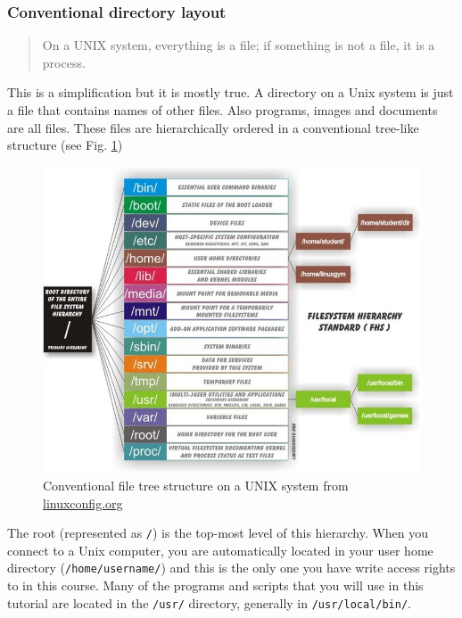\documentclass[11pt]{article}
\begin{document}
\subsubsection{Conventional directory layout}
\label{sec:orgheadline2}

\begin{quote}
On a UNIX system, everything is a file; if something is not a file, it is a process.
\end{quote}

This is a simplification but it is mostly true. A directory on a Unix
system is just a file that contains names of other files. Also
programs, images and documents are all files. These files are
hierarchically ordered in a conventional tree-like structure (see
Fig. \ref{fig:orgparagraph2})


\begin{figure}[htb]
\centering
\includegraphics[width=12cm]{linuxfiletree.jpg}
\caption{\label{fig:orgparagraph2}
Conventional file tree structure on a UNIX system from \href{http://linuxconfig.org/filesystem-basics}{linuxconfig.org}}
\end{figure}


The root (represented as \texttt{/}) is the top-most level of this hierarchy.
When you connect to a Unix computer, you are automatically located in
your user home directory (\texttt{/home/username/}) and this is the only one
you have write access rights to in this course. Many of the programs and
scripts that you will use in this tutorial are located in the \texttt{/usr/}
directory, generally in \texttt{/usr/local/bin/}. 
\end{document}
